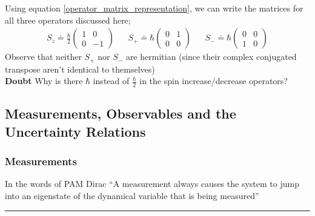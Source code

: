 \documentclass[12pt]{article}
\begin{document}
				Using equation \ref{operator_matrix_representation}, we can write the matrices for all three operators discussed here;
				\begin{align}
				S_z \doteq
				\frac \hbar 2
				\left(
				\begin{array}{cc}
					1 &0 \\
					0 &-1
				\end{array}
				\right)
				& &S_+ \doteq
				\hbar
				\left(
				\begin{array}{cc}
					0 &1 \\
					0 &0
				\end{array}
				\right)
				& &S_- \doteq
				\hbar
				\left(
				\begin{array}{cc}
					0 &0 \\
					1 &0
				\end{array}
				\right)
				\end{align}
				Observe that neither $S_+$ nor $S_-$ are hermitian (since their complex conjugated transpose aren't identical to themselves)\\
				{\bf Doubt} Why is there $\hbar$ instead of $\displaystyle \frac \hbar 2$ in the spin increase/decrease operators?
		\subsection{Measurements, Observables and the Uncertainty Relations}
			\subsubsection{Measurements}
				In the words of PAM Dirac ``A measurement always causes the system to jump into an eigenstate of the dynamical variable that is being measured''
\vspace{12pt}
\hrule
\end{document}
